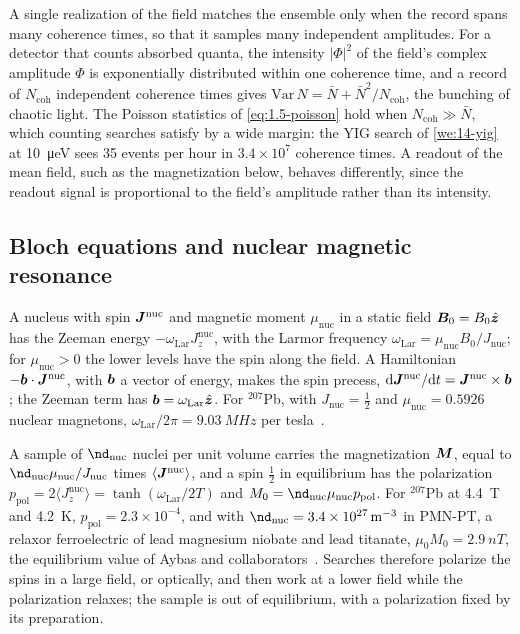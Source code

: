 A single realization of the field matches the ensemble only when the record spans many coherence times, so that it samples many independent amplitudes. For a detector that counts absorbed quanta, the intensity $|\Phi|^2$ of the field's complex amplitude $\Phi$ is exponentially distributed within one coherence time, and a record of $N_{\mathrm{coh}}$ independent coherence times gives $\mathrm{Var}\,N = \bar N + \bar N^2/N_{\mathrm{coh}}$, the bunching of chaotic light. The Poisson statistics of \cref{eq:1.5-poisson} hold when $N_{\mathrm{coh}} \gg \bar N$, which counting searches satisfy by a wide margin: the YIG search of \cref{we:14-yig} at \SI{10}{\micro eV} sees 35 events per hour in $3.4\times10^7$ coherence times. A readout of the mean field, such as the magnetization below, behaves differently, since the readout signal is proportional to the field's amplitude rather than its intensity.

\subsection{Bloch equations and nuclear magnetic resonance}\label{sec:14.6-bloch}

A nucleus with spin $\bm{J}^{\mathrm{nuc}}$ and magnetic moment $\mu_{\mathrm{nuc}}$ in a static field $\bm{B}_0 = B_0\hat{\bm{z}}$ has the Zeeman energy $-\omega_{\mathrm{Lar}}J^{\mathrm{nuc}}_z$, with the Larmor frequency $\omega_{\mathrm{Lar}} = \mu_{\mathrm{nuc}}B_0/J_{\mathrm{nuc}}$; for $\mu_{\mathrm{nuc}} > 0$ the lower levels have the spin along the field. A Hamiltonian $-\bm{b}\cdot\bm{J}^{\mathrm{nuc}}$, with $\bm{b}$ a vector of energy, makes the spin precess, $\mathrm{d}\bm{J}^{\mathrm{nuc}}/\mathrm{d} t = \bm{J}^{\mathrm{nuc}}\times\bm{b}$; the Zeeman term has $\bm{b} = \omega_{\mathrm{Lar}}\hat{\bm{z}}$. For $^{207}$Pb, with $J_{\mathrm{nuc}} = \frac12$ and $\mu_{\mathrm{nuc}} = 0.5926$ nuclear magnetons, $\omega_{\mathrm{Lar}}/2\pi = \SI{9.03}{MHz}$ per tesla~\cite[Eq.~(S11)]{aybas2021search}.

A sample of $\nd_{\mathrm{nuc}}$ nuclei per unit volume carries the magnetization $\bm{M}$, equal to $\nd_{\mathrm{nuc}}\mu_{\mathrm{nuc}}/J_{\mathrm{nuc}}$ times $\langle\bm{J}^{\mathrm{nuc}}\rangle$, and a spin $\frac12$ in equilibrium has the polarization $p_{\mathrm{pol}} = 2\langle J^{\mathrm{nuc}}_z\rangle = \tanh(\omega_{\mathrm{Lar}}/2T)$ and $M_0 = \nd_{\mathrm{nuc}}\mu_{\mathrm{nuc}}p_{\mathrm{pol}}$. For $^{207}$Pb at \SI{4.4}{T} and \SI{4.2}{K}, $p_{\mathrm{pol}} = 2.3\times10^{-4}$, and with $\nd_{\mathrm{nuc}} = \SI{3.4e27}{m^{-3}}$ in PMN-PT, a relaxor ferroelectric of lead magnesium niobate and lead titanate, $\mu_0M_0 = \SI{2.9}{nT}$, the equilibrium value of Aybas and collaborators~\cite[Eqs.~(S12), (S13)]{aybas2021search}. Searches therefore polarize the spins in a large field, or optically, and then work at a lower field while the polarization relaxes; the sample is out of equilibrium, with a polarization fixed by its preparation.

